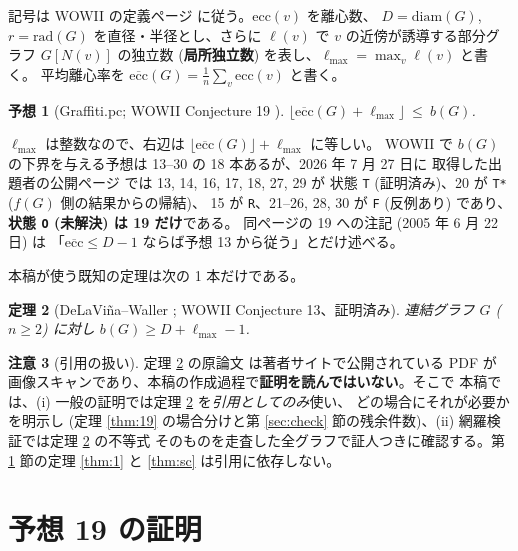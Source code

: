 \documentclass[paper=a4,fontsize=10.5pt,jafontsize=10.5pt]{jlreq}
\theoremstyle{plain}
\newtheorem{theorem}{定理}[section]
\newtheorem{conjecture}[theorem]{予想}
\theoremstyle{definition}
\newtheorem{remark}[theorem]{注意}
\begin{document}
記号は WOWII の定義ページ \cite{wowii} に従う。$\mathrm{ecc}(v)$ を離心数、
$D = \mathrm{diam}(G)$, $r = \mathrm{rad}(G)$ を直径・半径とし、さらに
$\ell(v)$ で $v$ の近傍が誘導する部分グラフ $G[N(v)]$ の独立数
(\textbf{局所独立数}) を表し、$\ell_{\max} = \max_v \ell(v)$ と書く。
平均離心率を $\overline{\mathrm{ecc}}(G) = \frac{1}{n}\sum_v
\mathrm{ecc}(v)$ と書く。

\begin{conjecture}[Graffiti.pc; WOWII Conjecture 19 \cite{wowii}]\label{conj:19}
$\bigl\lfloor \overline{\mathrm{ecc}}(G) + \ell_{\max} \bigr\rfloor
 \ \le \ b(G)$.
\end{conjecture}

$\ell_{\max}$ は整数なので、右辺は
$\lfloor \overline{\mathrm{ecc}}(G) \rfloor + \ell_{\max}$ に等しい。
WOWII で $b(G)$ の下界を与える予想は 13--30 の 18 本あるが、2026 年 7 月 27 日に
取得した出題者の公開ページ \cite{wowii} では 13, 14, 16, 17, 18, 27, 29 が
状態 \texttt{T} (証明済み)、20 が \texttt{T*} ($f(G)$ 側の結果からの帰結)、
15 が \texttt{R}、21--26, 28, 30 が \texttt{F} (反例あり) であり、\textbf{状態 \texttt{O} (未解決) は 19 だけ}である。
同ページの 19 への注記 (2005 年 6 月 22 日) は
「$\overline{\mathrm{ecc}} \le D - 1$ ならば予想 13 から従う」とだけ述べる。

本稿が使う既知の定理は次の 1 本だけである。

\begin{theorem}[DeLaViña--Waller \cite{dw2004}; WOWII Conjecture 13、証明済み]
\label{thm:13}
連結グラフ $G$ ($n \ge 2$) に対し $b(G) \ge D + \ell_{\max} - 1$.
\end{theorem}

\begin{remark}[引用の扱い]\label{rem:cite}
定理 \ref{thm:13} の原論文 \cite{dw2004} は著者サイトで公開されている PDF が
画像スキャンであり、本稿の作成過程で\textbf{証明を読んではいない}。そこで
本稿では、(i) 一般の証明では定理 \ref{thm:13} を\emph{引用としてのみ}使い、
どの場合にそれが必要かを明示し (定理 \ref{thm:19} の場合分けと第
\ref{sec:check} 節の残余件数)、(ii) 網羅検証では定理 \ref{thm:13} の不等式
そのものを走査した全グラフで証人つきに確認する。第 \ref{sec:proof} 節の定理
\ref{thm:1} と \ref{thm:sc} は引用に依存しない。
\end{remark}

\section{予想 19 の証明}\label{sec:proof}
\end{document}
